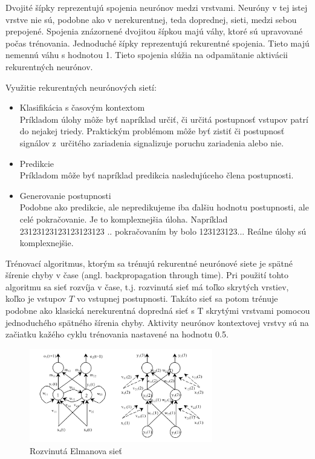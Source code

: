 Dvojité šípky reprezentujú spojenia neurónov medzi vrstvami. Neuróny v tej istej vrstve nie sú, podobne ako
v nerekurentnej, teda doprednej, sieti, medzi sebou prepojené. Spojenia znázornené dvojitou šípkou majú váhy, ktoré 
sú upravované počas trénovania.
Jednoduché šípky reprezentujú rekurentné spojenia. Tieto majú nemennú váhu s hodnotou 1.
Tieto spojenia slúžia na odpamätanie aktivácii rekurentných neurónov. 

Využitie rekurentných neurónových sietí:\\
\begin{itemize}
	\item Klasifikácia s časovým kontextom \\
	Príkladom úlohy môže byť napríklad určiť, či určitá postupnosť vstupov patrí do nejakej triedy.
	Praktickým problémom môže byť zistiť či postupnosť signálov z~určitého zariadenia signalizuje poruchu zariadenia alebo nie.
	\item Predikcie\\
	Príkladom môže byť napríklad predikcia nasledujúceho člena postupnosti.
	\item Generovanie postupnosti\\
	Podobne ako predikcie, ale nepredikujeme iba ďalšiu hodnotu postupnosti, ale celé pokračovanie.
	Je to komplexnejšia úloha. Napríklad 23123123123123123123 .. pokračovaním by bolo 123123123...
	Reálne úlohy sú komplexnejšie.
\end{itemize}

Trénovací algoritmus, ktorým sa trénujú rekurentné neurónové siete
je spätné šírenie chyby v čase (angl. backpropagation through time).
Pri použití tohto algoritmu sa sieť rozvíja v čase, t.j. rozvinutá sieť má
toľko skrytých vrstiev, koľko je vstupov $T$ vo vstupnej postupnosti. 
Takáto sieť sa potom trénuje podobne ako klasická nerekurentná dopredná sieť s T skrytými vrstvami pomocou jednoduchého spätného šírenia chyby.
Aktivity neurónov kontextovej vrstvy sú na začiatku kažého cyklu trénovania nastavené
na hodnotu 0.5.


\begin{figure}[H]
	\centering
	\includegraphics[width=8cm]{assets/elman}
	\caption{Rozvinutá Elmanova sieť}
\end{figure}


